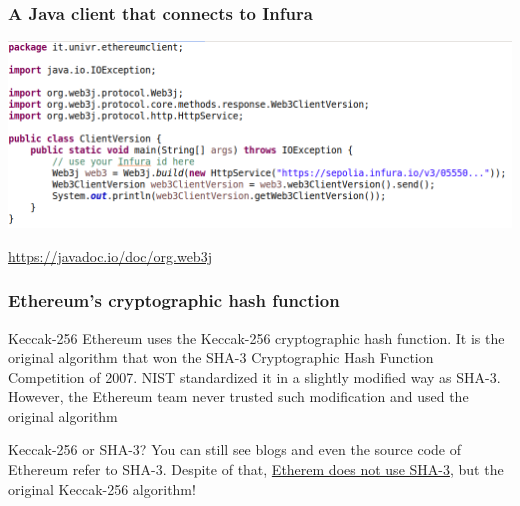 \documentclass[11pt]{beamer}  %
\begin{document}
\begin{frame}\frametitle{A Java client that connects to Infura}

  \begin{center}
    \includegraphics[width=\textwidth,clip=false]{pictures/client-version-java.png}
  \end{center}

  \bigskip

  \begin{center}
    \url{https://javadoc.io/doc/org.web3j}
  \end{center}

\end{frame}

\begin{frame}\frametitle{Ethereum's cryptographic hash function}

  \begin{greenbox}{Keccak-256}
    Ethereum uses the Keccak-256 cryptographic hash function.
    It is the original algorithm that won the SHA-3 Cryptographic Hash
    Function Competition of 2007. NIST standardized it in a slightly
    modified way as SHA-3. However, the Ethereum team never trusted
    such modification and used the original algorithm
  \end{greenbox}

  \bigskip

  \begin{redbox}{Keccak-256 or SHA-3?}
    You can still see blogs and even the source code of Ethereum refer
    to SHA-3. Despite of that, \underline{Etherem does not use SHA-3}, but the original
    Keccak-256 algorithm!
  \end{redbox}

\end{frame}
\end{document}
